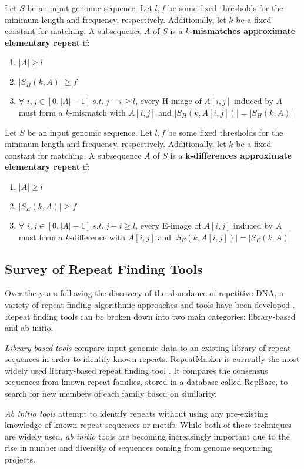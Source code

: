 \begin{defn}
Let $S$ be an input genomic sequence. Let $l, f$ be some fixed thresholds for the minimum length and frequency, respectively. Additionally, let $k$ be a fixed constant for matching. A subsequence $A$ of $S$ is a \textbf{$k$-mismatches approximate elementary repeat} if:
\begin{enumerate}
\item{$|A| \geq l$} 
\item{$|S_{H}(k, A)| \geq f$}
\item{$\forall$ $i, j \in [0,|A|-1] \ s.t. \ j-i \geq l$, every H-image of $A[i,j]$ induced by $A$ must form a $k$-mismatch with $A[i,j]$ and $|S_{H}(k, A[i,j])| = |S_{H}(k, A)|$}
\end{enumerate}
\label{approxrept}
\end{defn}

\begin{defn}
Let $S$ be an input genomic sequence. Let $l, f$ be some fixed thresholds for the minimum length and frequency, respectively. Additionally, let $k$ be a fixed constant for matching. A subsequence $A$ of $S$ is a \textbf{k-differences approximate elementary repeat} if:
\begin{enumerate}
\item{$|A| \geq l$} %
\item{$|S_{E}(k, A)| \geq f$}
\item{$\forall$ $i, j \in [0,|A|-1] \ s.t. \ j-i \geq l$, every E-image of $A[i,j]$ induced by $A$ must form a $k$-difference with $A[i,j]$ and $|S_{E}(k, A[i,j])| = |S_{E}(k, A)|$}
\end{enumerate}
\label{approxrept}
\end{defn}


\subsection{Survey of Repeat Finding Tools}
Over the years following the discovery of the abundance of repetitive DNA, a variety of repeat finding algorithmic approaches and tools have been developed \cite{saha2008computational}. Repeat finding tools can be broken down into two main categories: library-based and ab initio.

\textit{Library-based tools} compare input genomic data to an existing library of repeat sequences in order to identify known repeats. RepeatMasker \cite{smit1996repeatmasker} is currently the most widely used library-based repeat finding tool \cite{saha2008computational}. It compares the consensus sequences from known repeat families, stored in a database called RepBase, to search for new members of each family based on similarity.

\textit{Ab initio tools} attempt to identify repeats without using any pre-existing knowledge of known repeat sequences or motifs. While both of these techniques are widely used, \textit{ab initio} tools are becoming increasingly important due to the rise in number and diversity of sequences coming from genome sequencing projects.




